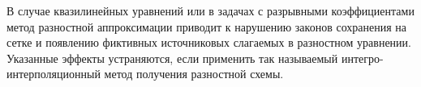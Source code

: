 \documentclass[a4paper,14pt]{article}
\begin{document}
В случае квазилинейных уравнений или в задачах с разрывными коэффициентами метод разностной аппроксимации
приводит к нарушению законов сохранения на сетке и появлению фиктивных 
источниковых слагаемых в разностном уравнении. Указанные эффекты устраняются, 
если применить так называемый интегро-интерполяционный метод получения
разностной схемы.
\newpage
\begin{figure}[!h]
	\label{fig:integr_interp}
\end{figure}
\newpage
\begin{figure}[!h]
	\label{fig:integr_interp2}
\end{figure}
\end{document}
